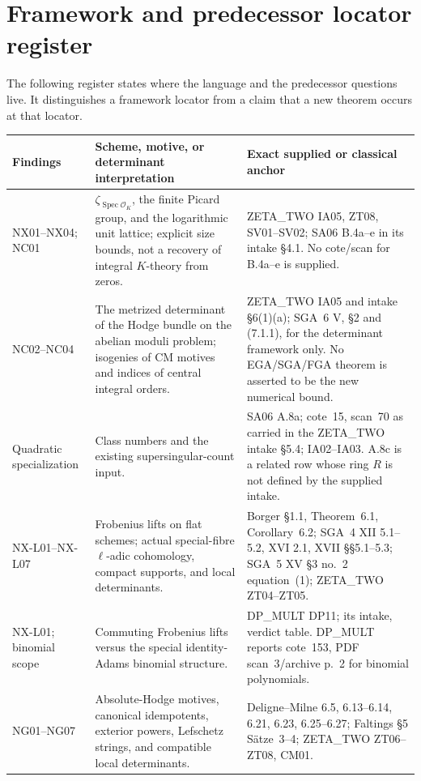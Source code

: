 \clearpage
\section{Framework and predecessor locator register}

The following register states where the language and the predecessor
questions live.  It distinguishes a framework locator from a claim
that a new theorem occurs at that locator.

\small
\begin{longtable}{p{}p{}p{}}
\toprule
Findings & Scheme, motive, or determinant interpretation & Exact supplied or classical anchor\\
\midrule
\endhead
NX01--NX04; NC01 &
$\zeta_{\operatorname{Spec}\mathcal O_K}$, the finite Picard group,
and the logarithmic unit lattice; explicit size bounds, not a recovery
of integral $K$-theory from zeros. &
ZETA\_TWO IA05, ZT08, SV01--SV02; SA06 B.4a--e in its intake
\S4.1. No cote/scan for B.4a--e is supplied.\\[3pt]
NC02--NC04 &
The metrized determinant of the Hodge bundle on the abelian moduli
problem; isogenies of CM motives and indices of central integral
orders. &
ZETA\_TWO IA05 and intake \S6(1)(a);
SGA~6 V, \S2 and (7.1.1), for the determinant framework only.
No EGA/SGA/FGA theorem is asserted to be the new numerical bound.\\[3pt]
Quadratic specialization &
Class numbers and the existing supersingular-count input. &
SA06 A.8a; cote~15, scan~70 as carried in the ZETA\_TWO intake
\S5.4; IA02--IA03. A.8c is a related row whose ring $R$ is not
defined by the supplied intake.\\[3pt]
NX-L01--NX-L07 &
Frobenius lifts on flat schemes; actual special-fibre
$\ell$-adic cohomology, compact supports, and local determinants. &
Borger \S1.1, Theorem~6.1, Corollary~6.2;
SGA~4 XII 5.1--5.2, XVI 2.1, XVII \S\S5.1--5.3;
SGA~5 XV \S3 no.~2 equation~(1);
ZETA\_TWO ZT04--ZT05.\\[3pt]
NX-L01; binomial scope &
Commuting Frobenius lifts versus the special identity-Adams
binomial structure. &
DP\_MULT DP11; its intake, verdict table.
DP\_MULT reports cote~153, PDF scan~3/archive p.~2
for binomial polynomials.\\[3pt]
NG01--NG07 &
Absolute-Hodge motives, canonical idempotents, exterior powers,
Lefschetz strings, and compatible local determinants. &
Deligne--Milne 6.5, 6.13--6.14, 6.21, 6.23, 6.25--6.27;
Faltings \S5 S\"atze~3--4; ZETA\_TWO ZT06--ZT08, CM01.\\[3pt]

\end{longtable}
